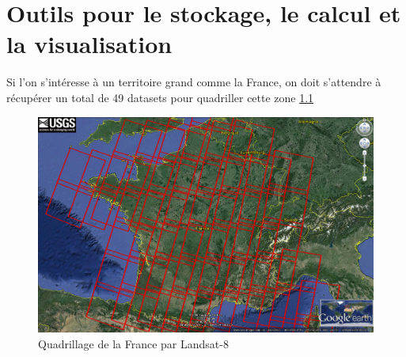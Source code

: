 \documentclass{book}
\begin{document}
\chapter{Outils pour le stockage, le calcul et la visualisation}

Si l'on s'intéresse à un territoire grand comme la France, on doit s'attendre à récupérer un total de 49 datasets 
pour quadriller cette zone \ref{quadrillage}\\
\begin{figure}[H]
\begin{center}
\includegraphics[scale=0.25]{emrpise_france_landsat8.jpg}
\end{center}
\caption{Quadrillage de la France par Landsat-8 \cite{geosud}}
\label{quadrillage}
\end{figure}
\clearpage
\end{document}
